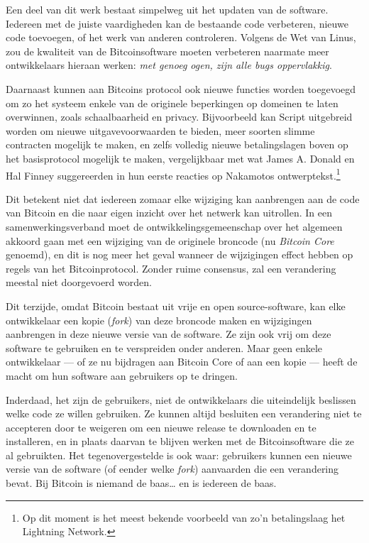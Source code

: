 \documentclass[
  a5paper,
  smalldemyvopaper,11pt,twoside,onecolumn,openright,extrafontsizes,
hidelinks]{memoir}
\begin{document}
Een deel van dit werk bestaat simpelweg uit het updaten van de software.
Iedereen met de juiste vaardigheden kan de bestaande code verbeteren,
nieuwe code toevoegen, of het werk van anderen controleren. Volgens de
Wet van Linus, zou de kwaliteit van de Bitcoinsoftware moeten verbeteren
naarmate meer ontwikkelaars hieraan werken: \emph{met genoeg ogen, zijn
alle bugs oppervlakkig}.

Daarnaast kunnen aan Bitcoins protocol ook nieuwe functies worden
toegevoegd om zo het systeem enkele van de originele beperkingen op
domeinen te laten overwinnen, zoals schaalbaarheid en privacy.
Bijvoorbeeld kan Script uitgebreid worden om nieuwe uitgavevoorwaarden
te bieden, meer soorten slimme contracten mogelijk te maken, en zelfs
volledig nieuwe betalingslagen boven op het basisprotocol mogelijk te
maken, vergelijkbaar met wat James A. Donald en Hal Finney suggereerden
in hun eerste reacties op Nakamotos ontwerptekst.\footnote{Op dit moment
  is het meest bekende voorbeeld van zo'n betalingslaag het Lightning
  Network.}

Dit betekent niet dat iedereen zomaar elke wijziging kan aanbrengen aan
de code van Bitcoin en die naar eigen inzicht over het netwerk kan
uitrollen. In een samenwerkingsverband moet de ontwikkelingsgemeenschap
over het algemeen akkoord gaan met een wijziging van de originele
broncode (nu \emph{Bitcoin Core} genoemd), en dit is nog meer het geval
wanneer de wijzigingen effect hebben op regels van het Bitcoinprotocol.
Zonder ruime consensus, zal een verandering meestal niet doorgevoerd
worden.

Dit terzijde, omdat Bitcoin bestaat uit vrije en open source-software,
kan elke ontwikkelaar een kopie (\emph{fork}) van deze broncode maken en
wijzigingen aanbrengen in deze nieuwe versie van de software. Ze zijn
ook vrij om deze software te gebruiken en te verspreiden onder anderen.
Maar geen enkele ontwikkelaar --- of ze nu bijdragen aan Bitcoin Core of
aan een kopie --- heeft de macht om hun software aan gebruikers op te
dringen.

Inderdaad, het zijn de gebruikers, niet de ontwikkelaars die
uiteindelijk beslissen welke code ze willen gebruiken. Ze kunnen altijd
besluiten een verandering niet te accepteren door te weigeren om een
nieuwe release te downloaden en te installeren, en in plaats daarvan te
blijven werken met de Bitcoinsoftware die ze al gebruikten. Het
tegenovergestelde is ook waar: gebruikers kunnen een nieuwe versie van
de software (of eender welke \emph{fork}) aanvaarden die een verandering
bevat. Bij Bitcoin is niemand de baas\ldots{} en is iedereen de baas.
\end{document}
